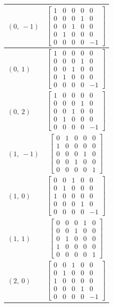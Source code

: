 \documentclass[11pt]{article}
\theoremstyle{definition}
\begin{document}
\begin{longtable}{|l|c|}
    \hline
    $\left( 0, \  -1\right)$ & ${\left[\begin{matrix}1 & 0 & 0 & 0 & 0\\0 & 0 & 0 & 1 & 0\\0 & 0 & 1 & 0 & 0\\0 & 1 & 0 & 0 & 0\\0 & 0 & 0 & 0 & -1\end{matrix}\right]}$ \\
    \hline
    $\left( 0, \  1\right)$ & ${\left[\begin{matrix}1 & 0 & 0 & 0 & 0\\0 & 0 & 0 & 1 & 0\\0 & 0 & 1 & 0 & 0\\0 & 1 & 0 & 0 & 0\\0 & 0 & 0 & 0 & -1\end{matrix}\right]}$ \\
    \hline
    $\left( 0, \  2\right)$ & ${\left[\begin{matrix}1 & 0 & 0 & 0 & 0\\0 & 0 & 0 & 1 & 0\\0 & 0 & 1 & 0 & 0\\0 & 1 & 0 & 0 & 0\\0 & 0 & 0 & 0 & -1\end{matrix}\right]}$ \\
    \hline
    $\left( 1, \  -1\right)$ & ${\left[\begin{matrix}0 & 1 & 0 & 0 & 0\\1 & 0 & 0 & 0 & 0\\0 & 0 & 0 & 1 & 0\\0 & 0 & 1 & 0 & 0\\0 & 0 & 0 & 0 & 1\end{matrix}\right]}$ \\
    \hline
    $\left( 1, \  0\right)$ & ${\left[\begin{matrix}0 & 0 & 1 & 0 & 0\\0 & 1 & 0 & 0 & 0\\1 & 0 & 0 & 0 & 0\\0 & 0 & 0 & 1 & 0\\0 & 0 & 0 & 0 & -1\end{matrix}\right]}$ \\
    \hline
    $\left( 1, \  1\right)$ & ${\left[\begin{matrix}0 & 0 & 0 & 1 & 0\\0 & 0 & 1 & 0 & 0\\0 & 1 & 0 & 0 & 0\\1 & 0 & 0 & 0 & 0\\0 & 0 & 0 & 0 & 1\end{matrix}\right]}$ \\
    \hline
    $\left( 2, \  0\right)$ & ${\left[\begin{matrix}0 & 0 & 1 & 0 & 0\\0 & 1 & 0 & 0 & 0\\1 & 0 & 0 & 0 & 0\\0 & 0 & 0 & 1 & 0\\0 & 0 & 0 & 0 & -1\end{matrix}\right]}$ \\
    \hline
\end{longtable}
\end{document}
